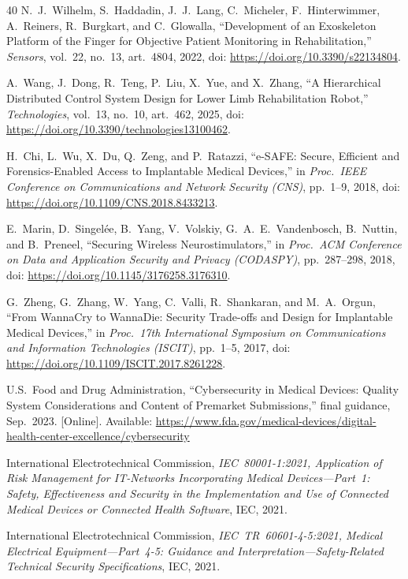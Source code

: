 \documentclass[journal]{IEEEtran}
\begin{document}
\begin{thebibliography}{40}
N.~J.~Wilhelm, S.~Haddadin, J.~J.~Lang, C.~Micheler, F.~Hinterwimmer, A.~Reiners, R.~Burgkart, and C.~Glowalla, ``Development of an Exoskeleton Platform of the Finger for Objective Patient Monitoring in Rehabilitation,'' \emph{Sensors}, vol.~22, no.~13, art.~4804, 2022, doi: \url{https://doi.org/10.3390/s22134804}.


A.~Wang, J.~Dong, R.~Teng, P.~Liu, X.~Yue, and X.~Zhang, ``A Hierarchical Distributed Control System Design for Lower Limb Rehabilitation Robot,'' \emph{Technologies}, vol.~13, no.~10, art.~462, 2025, doi: \url{https://doi.org/10.3390/technologies13100462}.

H.~Chi, L.~Wu, X.~Du, Q.~Zeng, and P.~Ratazzi, ``e-SAFE: Secure, Efficient and Forensics-Enabled Access to Implantable Medical Devices,'' in \emph{Proc.\ IEEE Conference on Communications and Network Security (CNS)}, pp.~1--9, 2018, doi: \url{https://doi.org/10.1109/CNS.2018.8433213}.

E.~Marin, D.~Singelée, B.~Yang, V.~Volskiy, G.~A.~E.~Vandenbosch, B.~Nuttin, and B.~Preneel, ``Securing Wireless Neurostimulators,'' in \emph{Proc.\ ACM Conference on Data and Application Security and Privacy (CODASPY)}, pp.~287--298, 2018, doi: \url{https://doi.org/10.1145/3176258.3176310}.


G.~Zheng, G.~Zhang, W.~Yang, C.~Valli, R.~Shankaran, and M.~A.~Orgun, ``From WannaCry to WannaDie: Security Trade-offs and Design for Implantable Medical Devices,'' in \emph{Proc.\ 17th International Symposium on Communications and Information Technologies (ISCIT)}, pp.~1--5, 2017, doi: \url{https://doi.org/10.1109/ISCIT.2017.8261228}.

U.S.~Food and Drug Administration, ``Cybersecurity in Medical Devices: Quality System Considerations and Content of Premarket Submissions,'' final guidance, Sep.~2023. [Online]. Available: \url{https://www.fda.gov/medical-devices/digital-health-center-excellence/cybersecurity}


International Electrotechnical Commission, \emph{IEC~80001-1:2021, Application of Risk Management for IT-Networks Incorporating Medical Devices---Part~1: Safety, Effectiveness and Security in the Implementation and Use of Connected Medical Devices or Connected Health Software}, IEC, 2021.

International Electrotechnical Commission, \emph{IEC~TR~60601-4-5:2021, Medical Electrical Equipment---Part~4-5: Guidance and Interpretation---Safety-Related Technical Security Specifications}, IEC, 2021.


\end{thebibliography}
\end{document}
